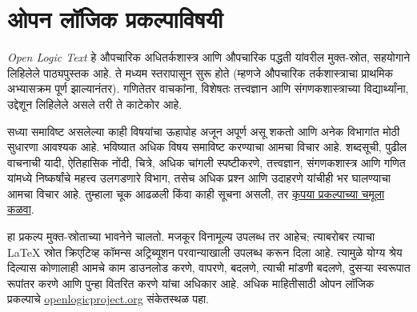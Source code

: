 \chapter*{ओपन लॉजिक प्रकल्पाविषयी}

\textit{Open Logic Text} हे औपचारिक अधितर्कशास्त्र आणि
औपचारिक पद्धती यांवरील मुक्त-स्रोत, सहयोगाने लिहिलेले पाठ्यपुस्तक
आहे. ते मध्यम स्तरापासून सुरू होते (म्हणजे औपचारिक तर्कशास्त्राचा
प्राथमिक अभ्यासक्रम पूर्ण झाल्यानंतर). गणितेतर वाचकांना, विशेषतः
तत्त्वज्ञान आणि संगणकशास्त्राच्या विद्यार्थ्यांना, उद्देशून लिहिलेले
असले तरी ते काटेकोर आहे.

सध्या समाविष्ट असलेल्या काही विषयांचा ऊहापोह अजून अपूर्ण
असू शकतो आणि अनेक विभागांत मोठी सुधारणा आवश्यक आहे. भविष्यात
अधिक विषय समाविष्ट करण्याचा आमचा विचार आहे. शब्दसूची, पुढील
वाचनाची यादी, ऐतिहासिक नोंदी, चित्रे, अधिक चांगली स्पष्टीकरणे,
तत्त्वज्ञान, संगणकशास्त्र आणि गणित यांमध्ये निष्कर्षांचे महत्त्व
उलगडणारे विभाग, तसेच अधिक प्रश्न आणि उदाहरणे यांचीही भर
घालण्याचा आमचा विचार आहे. तुम्हाला चूक आढळली किंवा काही सूचना
असली, तर \href{https://github.com/OpenLogicProject/OpenLogic/wiki/Contributing}{कृपया प्रकल्पाच्या चमूला कळवा}.

हा प्रकल्प मुक्त-स्रोताच्या भावनेने चालतो. मजकूर विनामूल्य
उपलब्ध तर आहेच; त्याबरोबर त्याचा LaTeX स्रोत क्रिएटिव्ह कॉमन्स
अट्रिब्यूशन परवान्याखाली उपलब्ध करून दिला आहे. त्यामुळे योग्य
श्रेय दिल्यास कोणालाही आमचे काम डाउनलोड करणे, वापरणे, बदलणे,
त्याची मांडणी बदलणे, दुसऱ्या स्वरूपात रूपांतर करणे आणि पुन्हा
वितरित करणे यांचा अधिकार आहे. अधिक माहितीसाठी ओपन लॉजिक
प्रकल्पाचे \href{http://openlogicproject.org/}{openlogicproject.org} संकेतस्थळ पहा.
